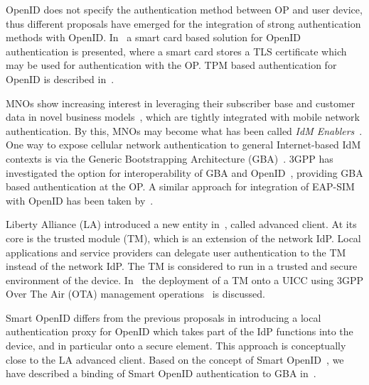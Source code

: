 \documentclass[runningheads,a4paper]{llncs}
\begin{document}
OpenID does not specify the authentication method between OP and user device, thus different proposals have emerged for the integration of strong authentication methods with OpenID. In~\cite{urien2011convergent,urien2010openid} a smart card based solution for OpenID authentication is presented, where a smart card stores a TLS certificate which may be used for authentication with the OP.
TPM based authentication for OpenID is described in~\cite{5678097}.

MNOs show increasing interest in leveraging their
subscriber base and customer data in novel business models~\cite{Telco2.0}, 
which are tightly integrated with mobile network authentication. By this, 
MNOs may become what has been called \textit{IdM Enablers}~\cite{camenisch2011privacy,Koschinat2011,koschinat2011privacy}.
One way to expose cellular network authentication to general Internet-based IdM contexts is via the Generic Bootstrapping Architecture (GBA)~\cite{3gpp.33.919}.
3GPP has investigated the option for interoperability of GBA and OpenID~\cite{3gpp.33.924,weik2008towards,Ahmed2010}, providing GBA based authentication at the OP. A similar approach for integration of EAP-SIM with OpenID has been taken by~\cite{jrstad2009releasing}.

Liberty Alliance (LA) introduced a new entity in~\cite{LAAdvClient2007}, called advanced client.
At its core is the trusted module (TM), which is an extension of the network IdP.
Local applications and service providers can delegate user authentication to the TM instead of the network IdP.
The TM is considered to run in a trusted and secure environment of the device.
In~\cite{LAAdvClientSIM} the deployment of a TM onto a UICC using 3GPP Over The Air (OTA) management operations~\cite{3gpp.31.115,3gpp.31.116} is discussed.

Smart OpenID differs from the previous proposals in introducing a local authentication proxy for OpenID which takes part of the IdP functions into the device, and in particular onto a secure element.
This approach is conceptually close to the LA advanced client.
Based on the concept of Smart OpenID~\cite{SmartOpenIDIFIP12}, we have described a binding of Smart OpenID authentication to GBA in~\cite{SmartOpenID_WWRF25}.
\end{document}
